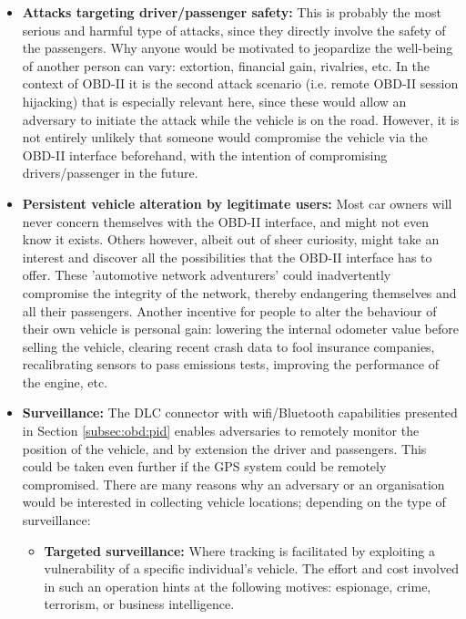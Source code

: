 \begin{itemize}
	\item \textbf{Attacks targeting driver/passenger safety:} This is probably the most serious and harmful type of attacks, since they directly involve the safety of the passengers. Why anyone would be motivated to jeopardize the well-being of another person can vary: extortion, financial gain, rivalries, etc. In the context of OBD-II it is the second attack scenario (i.e. remote OBD-II session hijacking) that is especially relevant here, since these would allow an adversary to initiate the attack while the vehicle is on the road. However, it is not entirely unlikely that someone would compromise the vehicle via the OBD-II interface beforehand, with the intention of compromising drivers/passenger in the future.
	
	\item \textbf{Persistent vehicle alteration by legitimate users:} Most car owners will never concern themselves with the OBD-II interface, and might not even know it exists. Others however, albeit out of sheer curiosity, might take an interest and discover all the possibilities that the OBD-II interface has to offer. These 'automotive network adventurers' could inadvertently compromise the integrity of the network, thereby endangering themselves and all their passengers. Another incentive for people to alter the behaviour of their own vehicle is personal gain: lowering the internal odometer value before selling the vehicle, clearing recent crash data to fool insurance companies, recalibrating sensors to pass emissions tests, improving the performance of the engine, etc.  
	
	\item \textbf{Surveillance:} The DLC connector with wifi/Bluetooth capabilities presented in Section \ref{subsec:obd:pid} enables adversaries to remotely monitor the position of the vehicle, and by extension the driver and passengers. This could be taken even further if the GPS system could be remotely compromised. There are many reasons why an adversary or an organisation would be interested in collecting vehicle locations; depending on the type of surveillance: 
	\begin{itemize}
		\item \textbf{Targeted surveillance:} Where tracking is facilitated by exploiting a vulnerability of a specific individual's vehicle. The effort and cost involved in such an operation hints at the following motives: espionage, crime, terrorism, or business intelligence.
		

\end{itemize}
\end{itemize}
